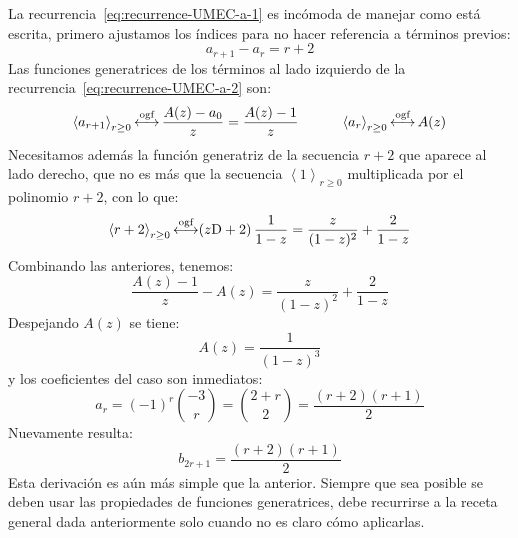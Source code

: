   La recurrencia~\eqref{eq:recurrence-UMEC-a-1}%
  es incómoda de manejar como está escrita,
  primero ajustamos los índices
  para no hacer referencia a términos previos:
  \begin{equation}
    \label{eq:recurrence-UMEC-a-2}
    a_{r + 1} - a_r
      = r + 2
  \end{equation}
  Las funciones generatrices de los términos al lado izquierdo
  de la recurrencia~\eqref{eq:recurrence-UMEC-a-2}
  son:%
  \begin{equation*}
    \left\langle a_{r + 1}\right\rangle_{r \ge 0}
      \operatorname{\stackrel{\text{ogf}}{\longleftrightarrow}} \frac{A(z) - a_0}{z}
      = \frac{A(z) - 1}{z}
    \hspace{3em}
    \left\langle a_r\right\rangle_{r \ge 0}
      \operatorname{\stackrel{\text{ogf}}{\longleftrightarrow}} A(z)
  \end{equation*}
  Necesitamos además la función generatriz de la secuencia \(r + 2\)
  que aparece al lado derecho,
  que no es más
  que la secuencia \(\left\langle 1\right\rangle_{r \ge 0}\)
  multiplicada por el polinomio \(r + 2\),
  con lo que:
  \begin{equation*}
    \left\langle r + 2\right\rangle_{r \ge 0}
      \operatorname{\stackrel{\text{ogf}}{\longleftrightarrow}} (z \mathrm{D} + 2) \, \frac{1}{1 - z}
      = \frac{z}{(1 - z)^2} + \frac{2}{1 - z}
  \end{equation*}
  Combinando las anteriores,
  tenemos:
  \begin{equation*}
    \frac{A(z) - 1}{z} - A(z)
      = \frac{z}{(1 - z)^2} + \frac{2}{1 - z}
  \end{equation*}
  Despejando \(A(z)\) se tiene:
  \begin{equation*}
    A(z)
      = \frac{1}{(1 - z)^3}
  \end{equation*}
  y los coeficientes del caso son inmediatos:
  \begin{equation*}
    a_r
      = (-1)^r \binom{-3}{r}
      = \binom{2 + r}{2}
      = \frac{(r + 2) (r + 1)}{2}
  \end{equation*}
  Nuevamente resulta:
  \begin{equation*}
    b_{2 r + 1}
      = \frac{(r + 2) (r + 1)}{2}
  \end{equation*}
  Esta derivación es aún más simple que la anterior.
  Siempre que sea posible
  se deben usar las propiedades de funciones generatrices,
  debe recurrirse a la receta general dada anteriormente
  solo cuando no es claro cómo aplicarlas.

